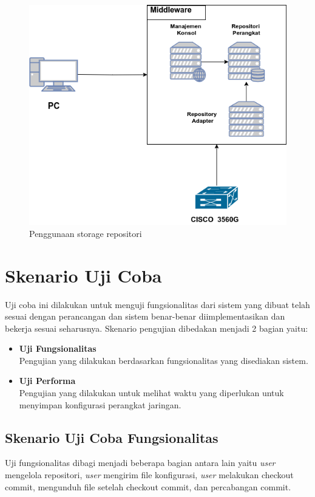 	\begin{figure}[H]
		\centering
		\includegraphics[width=\textwidth]{Images/C-5/Lingkungan-uji-coba.png}
		\caption{Penggunaan storage repositori}
		\label{lingkungan uji coba}
	\end{figure}

\section{Skenario Uji Coba}
Uji coba ini dilakukan untuk menguji fungsionalitas dari sistem yang dibuat telah sesuai dengan perancangan dan sistem benar-benar diimplementasikan dan bekerja sesuai seharusnya. Skenario pengujian dibedakan menjadi 2 bagian yaitu:
\begin{itemize}
	\item \textbf{Uji Fungsionalitas} \\
	Pengujian yang dilakukan berdasarkan fungsionalitas yang disediakan sistem.
	\item \textbf{Uji Performa} \\
	Pengujian yang dilakukan untuk melihat waktu yang diperlukan untuk menyimpan konfigurasi perangkat jaringan.
\end{itemize}  
	
    
    
    \subsection{Skenario Uji Coba Fungsionalitas}
    Uji fungsionalitas dibagi menjadi beberapa bagian antara lain yaitu \textit{user} mengelola repositori, \textit{user} mengirim file konfigurasi, \textit{user} melakukan checkout commit, mengunduh file setelah checkout commit, dan percabangan commit.
